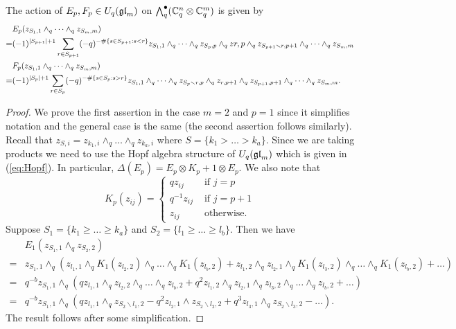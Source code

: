 \documentclass[11pt]{amsart}
\begin{document}
\begin{lem} \label{lem:Eaction}
The action of $E_p,F_p \in U_q({\mathfrak{gl}}_m)$ on ${\textstyle\bigwedge^{\bullet}_{q}} ({\mathbb{C}}_q^n \otimes {\mathbb{C}}_q^m)$ is given by 
\begin{align*} 
& E_p (z_{S_1,1} \wedge_q \cdots \wedge_q z_{S_m,m})  \\
=& (-1)^{|S_{p+1}|+1} \sum_{r \in S_{p+1}} (-q)^{- \# \{s \in S_{p+1}: s < r \}} z_{S_1,1} \wedge_q \cdots \wedge_q z_{S_p,p} \wedge_q z{r,p} \wedge_q z_{S_{p+1} \smallsetminus r,p+1} \wedge_q \cdots \wedge_q z_{S_m,m} \notag \\
& F_p (z_{S_1,1} \wedge_q \cdots \wedge_q z_{S_m,m}) \\
=& (-1)^{|S_p|+1} \sum_{r \in S_p} (-q)^{- \#\{s \in S_p: s > r \}} z_{S_1,1} \wedge_q \cdots \wedge_q z_{S_p \smallsetminus r,p} \wedge_q z_{r,p+1} \wedge_q z_{S_{p+1},p+1} \wedge_q \cdots \wedge_q z_{S_m,m}. \notag
\end{align*}
\end{lem}
\begin{proof}
We prove the first assertion in the case $m=2$ and $p=1$ since it simplifies notation and the general case is the same (the second assertion follows similarly). Recall that $z_{S,i} = z_{k_1,i} \wedge_q \dots \wedge_q z_{k_a,i}$ where $S = \{k_1 > \dots > k_a\}$. Since we are taking products we need to use the Hopf algebra structure of $U_q({\mathfrak{gl}}_m)$ which is given in (\ref{eq:Hopf}). In particular, $\Delta(E_p) = E_p \otimes K_p + 1 \otimes E_p$. We also note that 
$$K_p(z_{ij}) = 
\begin{cases}
q z_{ij} & \text{ if } j=p \\
q^{-1} z_{ij} & \text{ if } j=p+1 \\
z_{ij} & \text{ otherwise.}
\end{cases}$$
Suppose $S_1 = \{k_1 \ge \dots \ge k_a\}$ and $S_2 = \{l_1 \ge \dots \ge l_b\}$. Then we have
\begin{align*}
& E_1(z_{S_1,1} \wedge_q z_{S_2,2}) \\
=& z_{S_1,1} \wedge_q ( z_{l_1,1} \wedge_q K_1(z_{l_2,2}) \wedge_q \dots \wedge_q K_1(z_{l_b,2}) + z_{l_1,2} \wedge_q z_{l_2,1} \wedge_q K_1(z_{l_3,2}) \wedge_q \dots \wedge_q K_1(z_{l_b,2}) + \dots ) \\ 
=& q^{-b} z_{S_1,1} \wedge_q ( q z_{l_1,1} \wedge_q z_{l_2,2} \wedge_q \dots \wedge_q z_{l_b,2} + q^2 z_{l_1,2} \wedge_q z_{l_2,1} \wedge_q z_{l_3,2} \wedge_q \dots \wedge_q z_{l_b,2} + \dots) \\
=& q^{-b} z_{S_1,1} \wedge_q (q z_{l_1,1} \wedge_q z_{S_2 \smallsetminus l_1,2} - q^2 z_{l_2,1} \wedge z_{S_2 \smallsetminus l_2,2} + q^3 z_{l_3,1} \wedge_q z_{S_2 \smallsetminus l_3,2} - \dots ).
\end{align*}
The result follows after some simplification. 
\end{proof}
\end{document}
